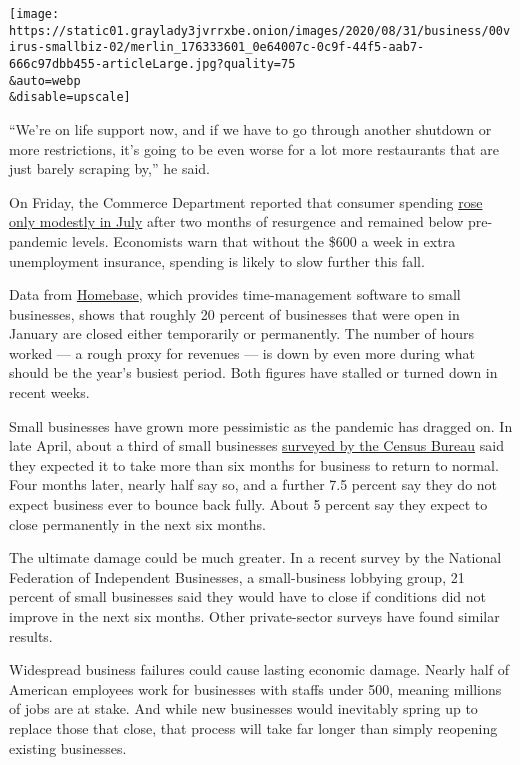 \texttt{[image: https://static01.graylady3jvrrxbe.onion/images/2020/08/31/business/00virus-smallbiz-02/merlin\_176333601\_0e64007c-0c9f-44f5-aab7-666c97dbb455-articleLarge.jpg?quality=75\\\&auto=webp\\\&disable=upscale]}

``We're on life support now, and if we have to go through another
shutdown or more restrictions, it's going to be even worse for a lot
more restaurants that are just barely scraping by,'' he said.

On Friday, the Commerce Department reported that consumer spending
\href{https://www.bea.gov/news/2020/personal-income-and-outlays-july-2020}{rose
only modestly in July} after two months of resurgence and remained below
pre-pandemic levels. Economists warn that without the \$600 a week in
extra unemployment insurance, spending is likely to slow further this
fall.

Data from \href{https://joinhomebase.com/data}{Homebase}, which provides
time-management software to small businesses, shows that roughly 20
percent of businesses that were open in January are closed either
temporarily or permanently. The number of hours worked --- a rough proxy
for revenues --- is down by even more during what should be the year's
busiest period. Both figures have stalled or turned down in recent
weeks.

Small businesses have grown more pessimistic as the pandemic has dragged
on. In late April, about a third of small businesses
\href{https://portal.census.gov/pulse/data/}{surveyed by the Census
Bureau} said they expected it to take more than six months for business
to return to normal. Four months later, nearly half say so, and a
further 7.5 percent say they do not expect business ever to bounce back
fully. About 5 percent say they expect to close permanently in the next
six months.

The ultimate damage could be much greater. In a recent survey by the
National Federation of Independent Businesses, a small-business lobbying
group, 21 percent of small businesses said they would have to close if
conditions did not improve in the next six months. Other private-sector
surveys have found similar results.

Widespread business failures could cause lasting economic damage. Nearly
half of American employees work for businesses with staffs under 500,
meaning millions of jobs are at stake. And while new businesses would
inevitably spring up to replace those that close, that process will take
far longer than simply reopening existing businesses.


